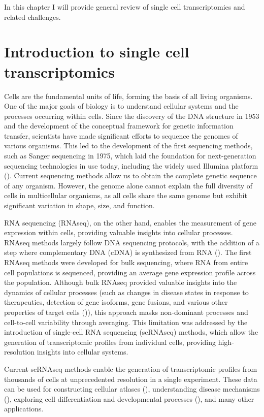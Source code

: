 In this chapter I will provide general review of single cell transcriptomics and related challenges.

\section{Introduction to single cell transcriptomics}

Cells are the fundamental units of life, forming the basis of all living organisms.
One of the major goals of biology is to understand cellular systems and the processes occurring within cells.
Since the discovery of the DNA structure in 1953 and the development of the conceptual framework for genetic information
transfer, scientists have made significant efforts to sequence the genomes of various organisms.
This led to the development of the first sequencing methods, such as Sanger sequencing in 1975,
which laid the foundation for next-generation sequencing technologies in use today,
including the widely used Illumina platform (\cite{Heather2016}).
Current sequencing methods allow us to obtain the complete genetic sequence of any organism.
However, the genome alone cannot explain the full diversity of cells in multicellular organisms,
as all cells share the same genome but exhibit significant variation in shape, size, and function.

RNA sequencing (RNAseq), on the other hand, enables the measurement of gene expression within cells,
providing valuable insights into cellular processes.
RNAseq methods largely follow DNA sequencing protocols,
with the addition of a step where complementary DNA (cDNA) is synthesized from RNA (\cite{Heumos2023}).
The first RNAseq methods were developed for bulk sequencing, where RNA from entire cell populations is sequenced,
providing an average gene expression profile across the population.
Although bulk RNAseq provided valuable insights into the dynamics of cellular processes
(such as changes in disease states in response to therapeutics, detection of gene isoforms, gene fusions,
and various other properties of target cells (\cite{Heumos2023})),
this approach masks non-dominant processes and cell-to-cell variability through averaging.
This limitation was addressed by the introduction of single-cell RNA sequencing (scRNAseq) methods,
which allow the generation of transcriptomic profiles from individual cells,
providing high-resolution insights into cellular systems.

Current scRNAseq methods enable the generation of transcriptomic profiles from thousands of cells
at unprecedented resolution in a single experiment.
These data can be used for constructing cellular atlases (\cite{Rozenblatt2017}),
understanding disease mechanisms (\cite{Zhang2024}),
exploring cell differentiation and developmental processes (\cite{Skinner2024}), and many other applications.

